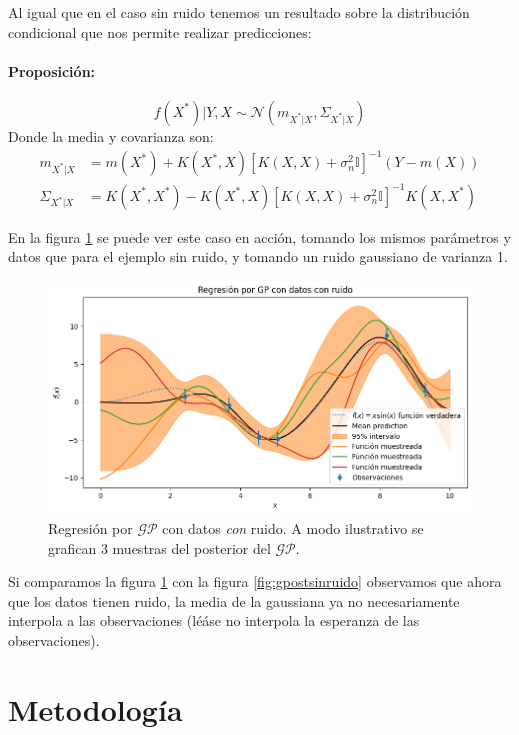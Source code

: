 \documentclass[a4paper]{article}
\newcommand{\gp}{\ensuremath{\mathcal{GP}}}
\begin{document}
Al igual que en el caso sin ruido tenemos un resultado sobre la distribución condicional que nos permite realizar predicciones:
\paragraph{Proposición:} 
	\begin{equation}
	f(X^*)|Y, X  \sim \mathcal{N}(m_{X^*|X}, \Sigma_{X^*|X})\label{eq:gp_posterior}
\end{equation}
Donde la media y covarianza son:
\begin{align}
	m_{X^*|X} & = m(X^*) + K(X^*, X) \left[K(X, X) + \sigma_n^2\mathbb{I}\right]^{-1} \left(Y - m(X)\right) \label{eq:gp_posterior_media}\\
	\Sigma_{X^*|X} & = K(X^*, X^*) - K(X^*, X) \left[K(X, X) + \sigma_n^2\mathbb{I}\right]^{-1} K(X, X^*)
\end{align}

En la figura \ref{fig:gpostconruido} se puede ver este caso en acción, tomando los mismos parámetros y datos que para el ejemplo sin ruido, y tomando un ruido gaussiano de varianza 1.
\begin{figure}[H]
	\centering
	\includegraphics[trim={0cm 0cm 0cm 0cm},clip,width=\textwidth]{gppostconruido.png}
	\caption{Regresión por $\gp$ con datos \emph{con} ruido. A modo ilustrativo se grafican 3 muestras del posterior del $\gp$.}
	\label{fig:gpostconruido}
\end{figure}
Si comparamos la figura \ref{fig:gpostconruido} con la figura \ref{fig:gpostsinruido} observamos que ahora que los datos tienen ruido, la media de la gaussiana ya no necesariamente interpola a las observaciones (léáse no interpola la esperanza de las observaciones).



\section{Metodología}
\end{document}
